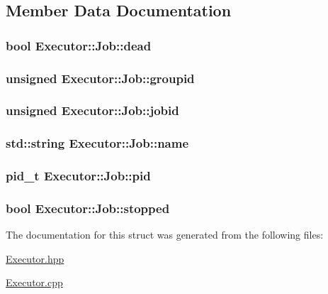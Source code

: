 \subsection{Member Data Documentation}
\hypertarget{structExecutor_1_1Job_a7574b1ef35cd0dace06aee928fead108}{
\subsubsection[{dead}]{\setlength{\rightskip}{0pt plus 5cm}bool {\bf Executor::Job::dead}}}
\label{structExecutor_1_1Job_a7574b1ef35cd0dace06aee928fead108}
\hypertarget{structExecutor_1_1Job_ab3f85f9152e9b5457896f1b72fa8508c}{
\subsubsection[{groupid}]{\setlength{\rightskip}{0pt plus 5cm}unsigned {\bf Executor::Job::groupid}}}
\label{structExecutor_1_1Job_ab3f85f9152e9b5457896f1b72fa8508c}
\hypertarget{structExecutor_1_1Job_a9429fceffd304e1666ba1e8d0495c3f9}{
\subsubsection[{jobid}]{\setlength{\rightskip}{0pt plus 5cm}unsigned {\bf Executor::Job::jobid}}}
\label{structExecutor_1_1Job_a9429fceffd304e1666ba1e8d0495c3f9}
\hypertarget{structExecutor_1_1Job_a38039efac2d62af668c99b63719f6125}{
\subsubsection[{name}]{\setlength{\rightskip}{0pt plus 5cm}std::string {\bf Executor::Job::name}}}
\label{structExecutor_1_1Job_a38039efac2d62af668c99b63719f6125}
\hypertarget{structExecutor_1_1Job_a8d9163526e877fe1f603b66504ef8950}{
\subsubsection[{pid}]{\setlength{\rightskip}{0pt plus 5cm}pid\_\-t {\bf Executor::Job::pid}}}
\label{structExecutor_1_1Job_a8d9163526e877fe1f603b66504ef8950}
\hypertarget{structExecutor_1_1Job_ac0ea0bc0c71fe4c1a2ad981df09fb5b0}{
\subsubsection[{stopped}]{\setlength{\rightskip}{0pt plus 5cm}bool {\bf Executor::Job::stopped}}}
\label{structExecutor_1_1Job_ac0ea0bc0c71fe4c1a2ad981df09fb5b0}


The documentation for this struct was generated from the following files:\begin{DoxyCompactItemize}
\item 
\hyperlink{Executor_8hpp}{Executor.hpp}\item 
\hyperlink{Executor_8cpp}{Executor.cpp}\end{DoxyCompactItemize}
